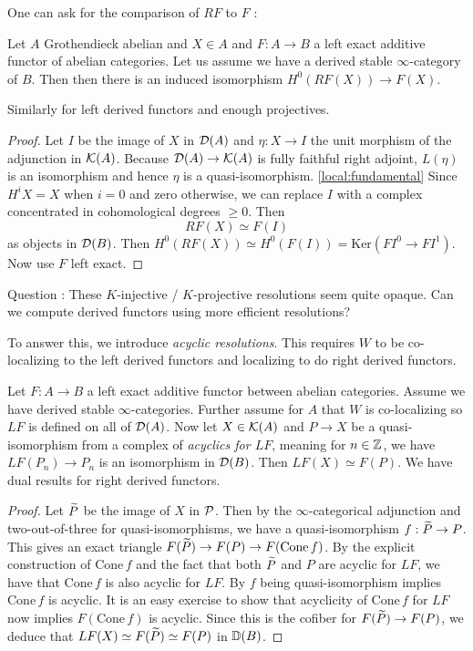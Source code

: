 \documentclass{article}
\begin{document}
One can ask for the comparison of $RF$ to $F$ : 
\begin{prop}
  Let $A$ Grothendieck abelian and $X \in A$
  and $F : A \to B$ a left exact additive functor of abelian categories.
  Let us assume we have a derived stable $\infty$-category of $B$.
  Then then there is an induced isomorphism $H^0(RF(X)) \to F(X)$.

  Similarly for left derived functors and enough projectives.
\end{prop}
\begin{proof}
  Let $I$ be the image of $X$ in $\mathcal{D}(A)$
  and $\eta : X \to I$ the unit morphism of the adjunction in $\mathcal{K}(A)$.
  Because $\mathcal{D}(A) \to \mathcal{K}(A)$ is fully faithful right adjoint,
  $L(\eta)$ is an isomorphism and hence $\eta$ is a quasi-isomorphism.
  \ref{local:fundamental}
  Since $H^i X = X$ when $i = 0$ and zero otherwise,
  we can replace $I$ with a complex concentrated in cohomological degrees 
  $\geq 0$.
  Then \[
    RF(X) \simeq F(I)
  \]
  as objects in $\mathcal{D}(B)$.
  Then $H^0(RF(X)) \simeq H^0(F(I)) = \mathrm{Ker}(F I^0 \to F I^1)$.
  Now use $F$ left exact.
\end{proof}
\begin{center}
  Question : These $K$-injective / $K$-projective resolutions
  seem quite opaque. Can we compute derived functors using 
  more efficient resolutions?
\end{center}
To answer this, we introduce \emph{acyclic resolutions}.
This requires $W$ to be co-localizing to the left derived functors
and localizing to do right derived functors.
\begin{prop}
  Let $F : A \to B$ a left exact additive functor between abelian categories.
  Assume we have derived stable $\infty$-categories.
  Further assume for $A$ that $W$ is co-localizing
  so $LF$ is defined on all of $\mathcal{D}(A)$.
  Now let $X \in \mathcal{K}(A)$ and $P \to X$ be a quasi-isomorphism
  from a complex of \emph{acyclics for $LF$}, meaning 
  for $n \in \mathbb{Z}$, we have $LF(P_n) \to P_n$ is an isomorphism in $\mathcal{D}(B)$.
  Then $LF(X) \simeq F(P)$.
  We have dual results for right derived functors.
\end{prop}
\begin{proof}
  Let $\widetilde{P}$ be the image of $X$ in $\mathcal{P}$.
  Then by the $\infty$-categorical adjunction
  and two-out-of-three for quasi-isomorphisms,
  we have a quasi-isomorphism $f : \widetilde{P} \to P$.
  This gives an exact triangle $F(\widetilde{P}) \to F(P) \to F(\mathrm{Cone}\,f)$.
  By the explicit construction of $\mathrm{Cone}\,f$ and
  the fact that both $\widetilde{P}$ and $P$ are acyclic for $LF$,
  we have that $\mathrm{Cone}\,f$ is also acyclic for $LF$.
  By $f$ being quasi-isomorphism implies $\mathrm{Cone}\,f$ is acyclic.
  It is an easy exercise to show that 
  acyclicity of $\mathrm{Cone}\,f$ for $LF$ now implies
  $F(\mathrm{Cone}\,f)$ is acyclic.
  Since this is the cofiber for $F(\widetilde{P}) \to F(P)$,
  we deduce that $LF(X) \simeq F(\widetilde{P}) \simeq F(P)$ in $\mathbb{D}(B)$.
\end{proof}
\end{document}

